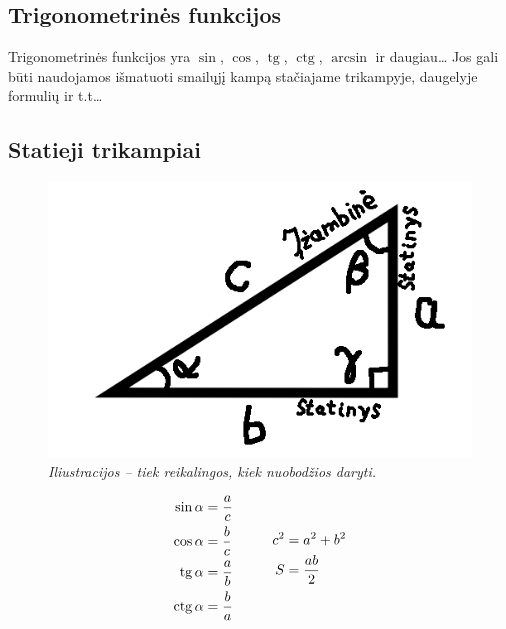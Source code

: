 \documentclass[fleqn]{article} %
\DeclareMathOperator{\tg}{tg}
\DeclareMathOperator{\ctg}{ctg}
\begin{document}
\subsection{Trigonometrinės funkcijos}
Trigonometrinės funkcijos yra $\sin$, $\cos$, $\tg$, $\ctg$, $\arcsin$ ir daugiau\dots
Jos gali būti naudojamos išmatuoti smailųjį kampą stačiajame trikampyje, daugelyje formulių ir t.t\dots

\subsection{Statieji trikampiai}
{
\begin{figure}
\caption{\textit{Iliustracijos -- tiek reikalingos, kiek nuobodžios daryti.}}
\includegraphics[scale=0.5]{right_triangle.png}
\end{figure}

\begin{equation*} \\
    \begin{aligned}[c]
        \sin \alpha &= \frac{a}{c} \\
        \cos \alpha &= \frac{b}{c} \\
        \tg  \alpha &= \frac{a}{b} \\
        \ctg \alpha &= \frac{b}{a}
    \end{aligned}
    \hspace{10mm}
    \begin{aligned}[c]
        c^2 &= a^2 + b^2 \\
        S &= \frac{ab}{2}
    \end{aligned}
\end{equation*}
}
\end{document}
